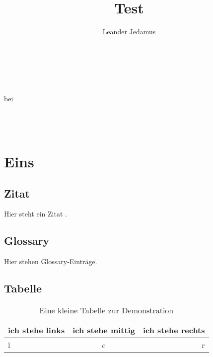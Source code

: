 \documentclass[ngermanb,12pt,twoside,openright,titlepage,numbers=noenddot,%
               headinclude,footinclude=true,BCOR=5mm]{scrreprt}
\title{Test}
\author{Leander Jedamus}
\begin{document}
  \begin{titlepage}
    \begin{center}
      \myTitle\\
      \mySubtitle\\
      \myDegree\myName\\
      bei \myProf\\
      \myUni\\
      \myLocation\\
      \myTime\\
      \myVersion
    \end{center}
\end{titlepage}

    \tableofcontents\cleardoublepage

  \maketitle

  \chapter{Eins}

    \section{Zitat}
      Hier steht ein Zitat \cite{cit:ljhj}. \\

    \section{Glossary}
      Hier stehen Glossary-Einträge. \\


    \section{Tabelle}
      \begin{table}[h]
        \begin{tabular}{||l|c|r||}
          \hline
          \hline
          ich stehe links & ich stehe mittig & ich stehe rechts \\
          \hline
          l & c & r \\
          \hline
          \hline
        \end{tabular}
        \caption[Tabelle]{Eine kleine Tabelle zur Demonstration}
        \label{tab:demo}
      \end{table}
\end{document}
